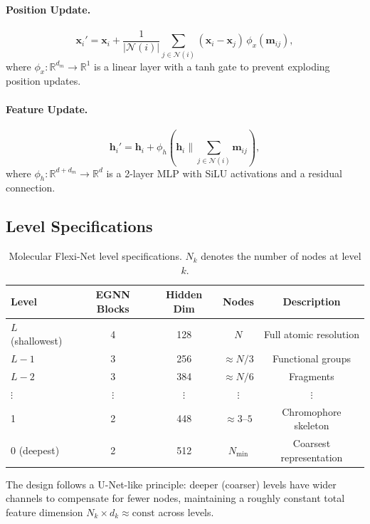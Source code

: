 \documentclass[12pt,a4paper]{article}
\providecommand{\R}{}
\renewcommand{\R}{\mathbb{R}}
\newcommand{\bx}{\bm{x}}
\newcommand{\bh}{\bm{h}}
\newcommand{\cN}{\mathcal{N}}
\begin{document}
\paragraph{Position Update.}
\begin{equation}\label{eq:arch_pos_update}
    \bx_i' = \bx_i + \frac{1}{|\cN(i)|} \sum_{j \in \cN(i)} (\bx_i - \bx_j)\, \phi_x(\bm{m}_{ij}),
\end{equation}
where $\phi_x: \R^{d_m} \to \R^1$ is a linear layer with a tanh gate to prevent exploding position updates.

\paragraph{Feature Update.}
\begin{equation}\label{eq:arch_feat_update}
    \bh_i' = \bh_i + \phi_h\!\left(\bh_i \| \sum_{j \in \cN(i)} \bm{m}_{ij}\right),
\end{equation}
where $\phi_h: \R^{d + d_m} \to \R^d$ is a 2-layer MLP with SiLU activations and a residual connection.

\subsection{Level Specifications}\label{sec:levels}

\begin{table}[H]
\centering
\caption{Molecular Flexi-Net level specifications. $N_k$ denotes the number of nodes at level $k$.}
\label{tab:levels}
\begin{tabular}{lcccc}
\toprule
\textbf{Level} & \textbf{EGNN Blocks} & \textbf{Hidden Dim} & \textbf{Nodes} & \textbf{Description} \\
\midrule
$L$ (shallowest) & 4 & 128 & $N$ & Full atomic resolution \\
$L-1$ & 3 & 256 & $\approx N/3$ & Functional groups \\
$L-2$ & 3 & 384 & $\approx N/6$ & Fragments \\
$\vdots$ & $\vdots$ & $\vdots$ & $\vdots$ & $\vdots$ \\
1 & 2 & 448 & $\approx 3$--$5$ & Chromophore skeleton \\
0 (deepest) & 2 & 512 & $N_{\min}$ & Coarsest representation \\
\bottomrule
\end{tabular}
\end{table}

The design follows a U-Net-like principle: deeper (coarser) levels have wider channels to compensate for fewer nodes, maintaining a roughly constant total feature dimension $N_k \times d_k \approx \text{const}$ across levels.
\end{document}
